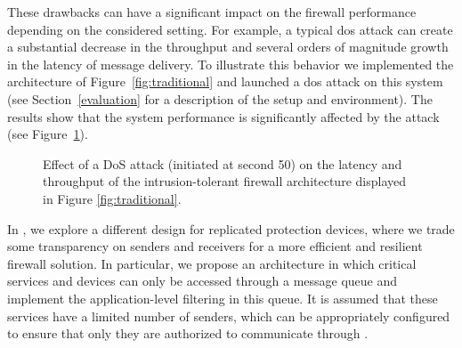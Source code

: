 These drawbacks can have a significant impact on the firewall performance depending on the considered setting. 
For example, a typical \gls{dos} attack can create a substantial decrease in the throughput and several orders of magnitude growth in the latency of message delivery. 
To illustrate this behavior we implemented the architecture of Figure~\ref{fig:traditional} and launched a \gls{dos} attack on this system (see Section~\ref{evaluation} for a description of the setup and environment). 
The results show that the system performance is significantly affected by the attack (see Figure~\ref{fig:attack_traditional}).


\begin{figure}[h]
\begin{center}
\hspace{-5mm}
\caption{Effect of a DoS attack (initiated at second 50) on the latency and throughput of the intrusion-tolerant firewall architecture displayed in Figure \ref{fig:traditional}.}
\label{fig:attack_traditional}
\end{center}
\end{figure}

In \sieveq, we explore a different design for replicated protection devices, where we trade some transparency on senders and receivers for a more efficient and resilient firewall solution.
In particular, we propose an architecture in which critical services and devices can only be accessed through a message queue and implement the application-level filtering in this queue.
It is assumed that these services have a limited number of senders, which can be appropriately configured to ensure that only they are authorized to communicate through \sieveq.

